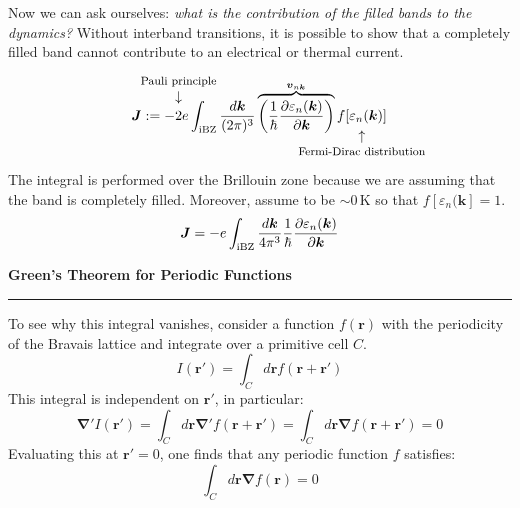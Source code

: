 \documentclass[10.75pt,a4paper,openright,bottom=2cm]{article}
\renewcommand{\Vec}[1]{\boldsymbol{#1}}
\newcommand{\RN}[1]{%
  \textup{\uppercase\expandafter{\romannumeral#1}}%
}
\begin{document}
Now we can ask ourselves: \textit{what is the contribution of the filled bands to the dynamics?} Without interband transitions, it is possible to show that a completely filled band cannot contribute to an electrical or thermal current.
\[
\Vec{J}:=-\overset{\mathclap{\tikz \node {$\downarrow$} node [above=1ex] {\footnotesize Pauli principle };}}{2}e\int_{\text{\RN{1}BZ}}\frac{d\Vec{k}}{(2\pi)^3}\overbrace{\left(\frac{1}{\hbar}\frac{\partial \varepsilon_n(\Vec{k})}{\partial\Vec{k}}\right)}^{\Vec{v}_{n\Vec{k}}}\underset{\mathclap{\tikz \node {$\uparrow$} node [below=1ex] {\footnotesize Fermi-Dirac distribution};}}{f[\varepsilon_n(\Vec{k})]}
\]
The integral is performed over the  Brillouin zone because we are assuming that the band is completely filled. Moreover, assume to be $\sim0$\,K so that $f[\varepsilon_n(\Vec{k}]=1$.
\[
\Vec{J}=-e\int_{\text{\RN{1}BZ}}\frac{d\Vec{k}}{4\pi^3}\frac{1}{\hbar}\frac{\partial \varepsilon_n(\Vec{k})}{\partial\Vec{k}}
\]
\begin{mybox}
\textbf{Green's Theorem for Periodic Functions{\color{blue!30}{g}}}
\hrule
\vspace{0.2cm}
To see why this integral vanishes,
consider a function $f(\Vec{r})$ with the periodicity of the Bravais lattice and integrate over a primitive cell $C$.
\[
I(\Vec{r'})=\int_Cd\Vec{r}f(\Vec{r}+\Vec{r'})
\]
This integral is independent on $\Vec{r'}$, in particular:
\[
\Vec{\nabla'}I(\Vec{r'})=\int_Cd\Vec{r}\Vec{\nabla'}f(\Vec{r}+\Vec{r'})=\int_Cd\Vec{r}\Vec{\nabla}f(\Vec{r}+\Vec{r'})=0
\]
Evaluating this at $\Vec{r'}=0$, one finds that any periodic function $f$ satisfies:
\[
\int_Cd\Vec{r}\Vec{\nabla}f(\Vec{r})=0
\]
\end{mybox}\noindent
\end{document}
